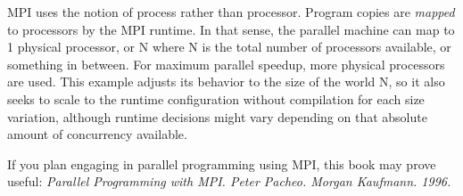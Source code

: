 MPI uses the notion of process rather than processor. Program copies are \textit{mapped} to processors by the MPI runtime. In that sense, the parallel machine can map to 1 physical processor, or N where N is the total number of processors available, or something in between. For maximum parallel speedup, more physical processors are used. This example adjusts its behavior to the size of the world N, so it also seeks to scale to the runtime configuration without compilation for each size variation, although runtime decisions might vary depending on that absolute amount of concurrency available.


 If you plan engaging in parallel programming using MPI, this book may prove useful:  \textit{Parallel Programming with MPI. Peter Pacheo. Morgan Kaufmann. 1996.}
